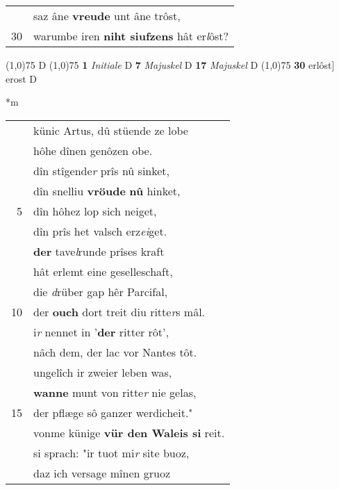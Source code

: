 \documentclass[8pt,a4paper,notitlepage]{article}
\begin{document}
\begin{table}[ht]
\begin{minipage}[t]{0.5\linewidth}
\begin{tabular}{rl}
 & saz âne \textbf{vreude} unt âne trôst,\\ 
30 & warumbe iren \textbf{niht siufzens} hât er\textit{l}ôst?\\ 
\end{tabular}
\scriptsize
\line(1,0){75} \newline
D \newline
\line(1,0){75} \newline
\textbf{1} \textit{Initiale} D  \textbf{7} \textit{Majuskel} D  \textbf{17} \textit{Majuskel} D  \newline
\line(1,0){75} \newline
\textbf{30} erlôst] erost D \newline
\end{minipage}
\hspace{0.5cm}
\begin{minipage}[t]{0.5\linewidth}
\small
\begin{center}*m
\end{center}
\begin{tabular}{rl}
 & künic Artus, dû stüende ze lobe\\ 
 & hôhe dînen genôzen obe.\\ 
 & dîn stîgende\textit{r} prîs nû sinket,\\ 
 & dîn snelliu \textbf{vröude} \textbf{nû} hinket,\\ 
5 & dîn hôhez lop sich neiget,\\ 
 & dîn prîs het valsch erz\textit{ei}get.\\ 
 & \textbf{der} tave\textit{l}runde prîses kraft\\ 
 & hât erlemt eine geselleschaft,\\ 
 & die \textit{d}rüber gap hêr Parcifal,\\ 
10 & der \textbf{ouch} dort treit diu ritte\textit{r}s mâl.\\ 
 & i\textit{r} nennet in '\textbf{der} ritter rôt',\\ 
 & nâch dem, der lac vor Nantes tôt.\\ 
 & ungelîch ir zweier leben was,\\ 
 & \textbf{wanne} munt von ritte\textit{r} nie gelas,\\ 
15 & der pflæge sô ganzer werdicheit."\\ 
 & vonme künige \textbf{vür den Waleis si} reit.\\ 
 & si sprach: "ir tuot mi\textit{r} site buoz,\\ 
 & daz ich versage mînen gruoz\\ 

\end{tabular}
\end{minipage}
\end{table}
\end{document}
